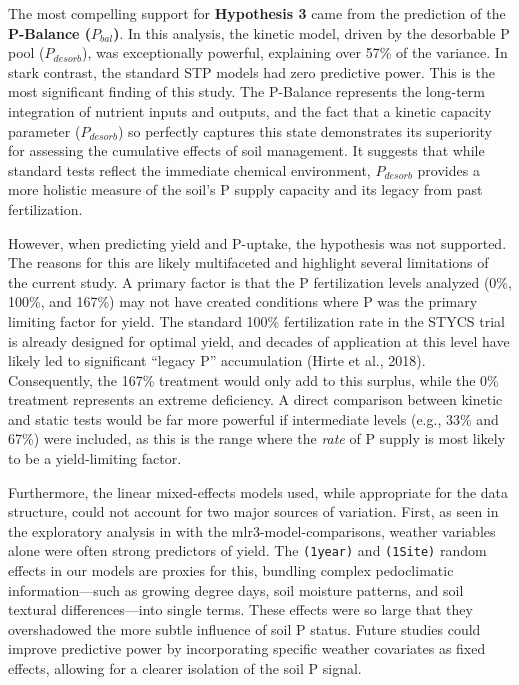 \documentclass[
  a4paper,
]{article}
\begin{document}
The most compelling support for \textbf{Hypothesis 3} came from the
prediction of the \textbf{P-Balance (\(P_{bal}\))}. In this analysis,
the kinetic model, driven by the desorbable P pool (\(P_{desorb}\)), was
exceptionally powerful, explaining over 57\% of the variance. In stark
contrast, the standard STP models had zero predictive power. This is the
most significant finding of this study. The P-Balance represents the
long-term integration of nutrient inputs and outputs, and the fact that
a kinetic capacity parameter (\(P_{desorb}\)) so perfectly captures this
state demonstrates its superiority for assessing the cumulative effects
of soil management. It suggests that while standard tests reflect the
immediate chemical environment, \(P_{desorb}\) provides a more holistic
measure of the soil's P supply capacity and its legacy from past
fertilization.

However, when predicting yield and P-uptake, the hypothesis was not
supported. The reasons for this are likely multifaceted and highlight
several limitations of the current study. A primary factor is that the P
fertilization levels analyzed (0\%, 100\%, and 167\%) may not have
created conditions where P was the primary limiting factor for yield.
The standard 100\% fertilization rate in the STYCS trial is already
designed for optimal yield, and decades of application at this level
have likely led to significant ``legacy P'' accumulation (Hirte et al.,
2018). Consequently, the 167\% treatment would only add to this surplus,
while the 0\% treatment represents an extreme deficiency. A direct
comparison between kinetic and static tests would be far more powerful
if intermediate levels (e.g., 33\% and 67\%) were included, as this is
the range where the \emph{rate} of P supply is most likely to be a
yield-limiting factor.

Furthermore, the linear mixed-effects models used, while appropriate for
the data structure, could not account for two major sources of
variation. First, as seen in the exploratory analysis in with the
mlr3-model-comparisons, weather variables alone were often strong
predictors of yield. The \texttt{(1\textbar{}year)} and
\texttt{(1\textbar{}Site)} random effects in our models are proxies for
this, bundling complex pedoclimatic information---such as growing degree
days, soil moisture patterns, and soil textural differences---into
single terms. These effects were so large that they overshadowed the
more subtle influence of soil P status. Future studies could improve
predictive power by incorporating specific weather covariates as fixed
effects, allowing for a clearer isolation of the soil P signal.
\end{document}
